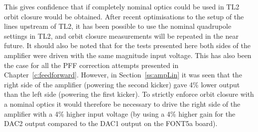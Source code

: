 This gives confidence that if completely nominal optics could be 
used in TL2 orbit closure would be obtained. 
After recent optimisations to the setup of the lines upstream of TL2, it has been possible to use the nominal quadrupole settings in TL2, and orbit closure measurements will be repeated in the near future.
It should also be 
noted that for the tests presented here both sides of the amplifier were driven with the same magnitude input voltage. This has also been the case for 
all the PFF correction attempts presented in Chapter~\ref{c:feedforward}. 
However, in Section~\ref{ss:ampLin} it was seen that the right side of the amplifier (powering the second kicker) gave 4\% lower output than the left side (powering the first kicker).
To strictly enforce orbit closure with a nominal optics it would 
therefore be necessary to drive the right side of the amplifier with 
a 4\% higher input voltage (by using a 4\% higher gain for the DAC2 
output compared to the DAC1 output on the FONT5a board).




